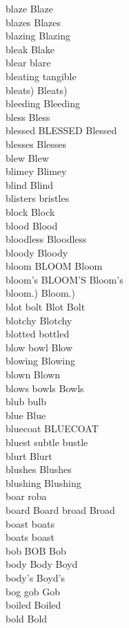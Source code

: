blaze Blaze\\
blazes Blazes\\
blazing Blazing\\
bleak Blake\\
blear blare\\
bleating tangible\\
bleats) Bleats)\\
bleeding Bleeding\\
bless Bless\\
blessed BLESSED Blessed\\
blesses Blesses\\
blew Blew\\
blimey Blimey\\
blind Blind\\
blisters bristles\\
block Block\\
blood Blood\\
bloodless Bloodless\\
bloody Bloody\\
bloom BLOOM Bloom\\
bloom's BLOOM'S Bloom's\\
bloom.) Bloom.)\\
blot bolt Blot Bolt\\
blotchy Blotchy\\
blotted bottled\\
blow bowl Blow\\
blowing Blowing\\
blown Blown\\
blows bowls Bowls\\
blub bulb\\
blue Blue\\
bluecoat BLUECOAT\\
bluest subtle bustle\\
blurt Blurt\\
blushes Blushes\\
blushing Blushing\\
boar roba\\
board Board broad Broad\\
boast boats\\
boats boast\\
bob BOB Bob\\
body Body Boyd\\
body's Boyd's\\
bog gob Gob\\
boiled Boiled\\
bold Bold\\
